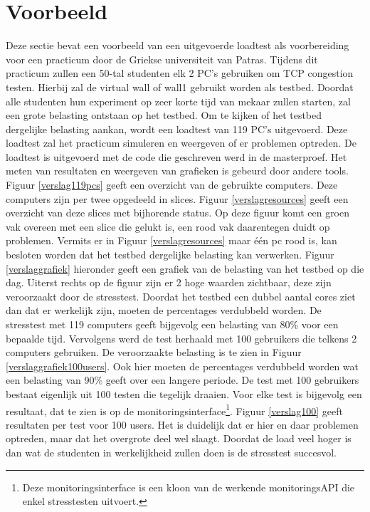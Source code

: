 \section{Voorbeeld}
\npar
Deze sectie bevat een voorbeeld van een uitgevoerde loadtest als voorbereiding voor een practicum door de Griekse universiteit van Patras. Tijdens dit practicum zullen een 50-tal studenten elk 2 PC's gebruiken om TCP congestion testen. Hierbij zal de virtual wall of wall1 gebruikt worden als testbed. Doordat alle studenten hun experiment op zeer korte tijd van mekaar zullen starten, zal een grote belasting ontstaan op het testbed. Om te kijken of het testbed dergelijke belasting aankan, wordt een loadtest van 119 PC's uitgevoerd. Deze loadtest zal het practicum simuleren en weergeven of er problemen optreden. De loadtest is uitgevoerd met de code die geschreven werd in de masterproef. Het meten van resultaten en weergeven van grafieken is gebeurd door andere tools.
\npar
Figuur \ref{verslag119pcs} geeft een overzicht van de gebruikte computers. Deze computers zijn per twee opgedeeld in slices. Figuur \ref{verslagresources} geeft een overzicht van deze slices met bijhorende status. Op deze figuur komt een groen vak overeen met een slice die gelukt is, een rood vak daarentegen duidt op problemen.
\npar
Vermits er in Figuur \ref{verslagresources} maar \'e\'en pc rood is, kan besloten worden dat het testbed dergelijke belasting kan verwerken. Figuur \ref{verslaggrafiek} hieronder geeft een grafiek van de belasting van het testbed op die dag. Uiterst rechts op de figuur zijn er 2 hoge waarden zichtbaar, deze zijn veroorzaakt door de stresstest. Doordat het testbed een dubbel aantal cores ziet dan dat er werkelijk zijn, moeten de percentages verdubbeld worden. De stresstest met 119 computers geeft bijgevolg een belasting van 80\% voor een bepaalde tijd.
\clearpage
\npar
Vervolgens werd de test herhaald met 100 gebruikers die telkens 2 computers gebruiken. De veroorzaakte belasting is te zien in Figuur \ref{verslaggrafiek100users}. Ook hier moeten de percentages verdubbeld worden wat een belasting van 90\% geeft over een langere periode.
\npar
De test met 100 gebruikers bestaat eigenlijk uit 100 testen die tegelijk draaien. Voor elke test is bijgevolg een resultaat, dat te zien is op de monitoringsinterface\footnote{Deze monitoringsinterface is een kloon van de werkende monitoringsAPI die enkel stresstesten uitvoert.}. Figuur \ref{verslag100} geeft resultaten per test voor 100 users. Het is duidelijk dat er hier en daar problemen optreden, maar dat het overgrote deel wel slaagt.
\npar
Doordat de load veel hoger is dan wat de studenten in werkelijkheid zullen doen is de stresstest succesvol. 
